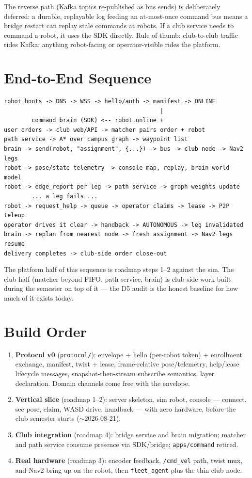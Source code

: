 \documentclass[11pt]{article}
\begin{document}
The reverse path (Kafka topics re-published as bus sends) is deliberately deferred: a
durable, replayable log feeding an at-most-once command bus means a bridge restart
can replay stale commands at robots. If a club service needs to command a robot, it
uses the SDK directly. Rule of thumb: club-to-club traffic rides Kafka; anything
robot-facing or operator-visible rides the platform.

\section{End-to-End Sequence}

\begin{lstlisting}
robot boots -> DNS -> WSS -> hello/auth -> manifest -> ONLINE
                                             |
        command brain (SDK) <-- robot.online +
user orders -> club web/API -> matcher pairs order + robot
path service -> A* over campus graph -> waypoint list
brain -> send(robot, "assignment", {...}) -> bus -> club node -> Nav2 legs
robot -> pose/state telemetry -> console map, replay, brain world model
robot -> edge_report per leg -> path service -> graph weights update
        ... a leg fails ...
robot -> request_help -> queue -> operator claims -> lease -> P2P teleop
operator drives it clear -> handback -> AUTONOMOUS -> leg invalidated
brain -> replan from nearest node -> fresh assignment -> Nav2 legs resume
delivery completes -> club-side order close-out
\end{lstlisting}

The platform half of this sequence is roadmap steps 1--2 against the sim. The club
half (matcher beyond FIFO, path service, brain) is club-side work built during the
semester on top of it --- the D5 audit is the honest baseline for how much of it
exists today.

\section{Build Order}

\begin{enumerate}[itemsep=1pt]
  \item \textbf{Protocol v0} (\texttt{protocol/}): envelope + hello (per-robot
        token) + enrollment exchange, manifest, twist + lease, frame-relative
        pose/telemetry, help/lease lifecycle messages, snapshot-then-stream subscribe
        semantics, layer declaration. Domain channels come free with the envelope.
  \item \textbf{Vertical slice} (roadmap 1--2): server skeleton, sim robot, console
        --- connect, see pose, claim, WASD drive, handback --- with zero hardware,
        before the club semester starts ($\sim$2026-08-21).
  \item \textbf{Club integration} (roadmap 4): bridge service and brain migration;
        matcher and path service consume presence via SDK/bridge;
        \texttt{apps/command} retired.
  \item \textbf{Real hardware} (roadmap 3): encoder feedback, \texttt{/cmd\_vel}
        path, twist mux, and Nav2 bring-up on the robot, then \texttt{fleet\_agent}
        plus the thin club node.
\end{enumerate}
\end{document}
